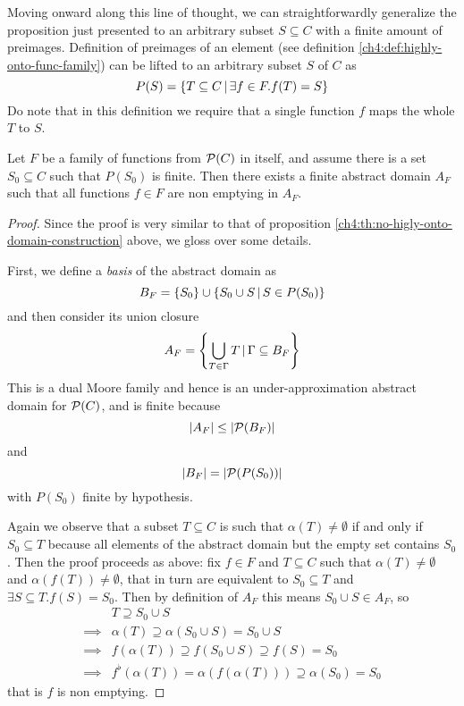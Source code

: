 Moving onward along this line of thought, we can straightforwardly generalize the proposition just presented to an arbitrary subset $S \subseteq C$ with a finite amount of preimages.
Definition of preimages of an element (see definition \ref{ch4:def:highly-onto-func-family}) can be lifted to an arbitrary subset $S$ of $C$ as
\[
P(S) = \{ T \subseteq C \,\vert\, \exists f \in F. f(T) = S \}
\]
Do note that in this definition we require that a single function $f$ maps the whole $T$ to $S$.
\begin{prop}\label{ch4:th:existence-finte-backward}
	Let $F$ be a family of functions from $\mathcal{P}(C)$ in itself, and assume there is a set $S_0 \subseteq C$ such that $P(S_0)$ is finite. Then there exists a finite abstract domain $A_F$ such that all functions $f \in F$ are non emptying in $A_F$.
\end{prop}
\begin{proof}
	Since the proof is very similar to that of proposition \ref{ch4:th:no-higly-onto-domain-construction} above, we gloss over some details.

	First, we define a \textit{basis} of the abstract domain as
	\[
	B_F = \{ S_0 \} \cup \{ S_0 \cup S \,\vert\, S \in P(S_0) \}
	\]
	and then consider its union closure
	\[
	A_F = \left\lbrace \bigcup\limits_{T \in \Gamma} T \,\vert\, \Gamma \subseteq B_F \right\rbrace
	\]
	This is a dual Moore family and hence is an under-approximation abstract domain for $\mathcal{P}(C)$, and is finite because
	\[
	\lvert A_F\rvert \le \lvert\mathcal{P}(B_F)\rvert
	\]
	and
	\[
	\lvert B_F\rvert = \lvert\mathcal{P}(P(S_0))\rvert
	\]
	with $P(S_0)$ finite by hypothesis.

	Again we observe that a subset $T \subseteq C$ is such that $\alpha(T) \neq \emptyset$ if and only if $S_0 \subseteq T$ because all elements of the abstract domain but the empty set contains $S_0$. Then the proof proceeds as above: fix $f \in F$ and $T \subseteq C$ such that $\alpha(T) \neq \emptyset$ and $\alpha(f(T)) \neq \emptyset$, that in turn are equivalent to $S_0 \subseteq T$ and $\exists S \subseteq T. f(S) = S_0$. Then by definition of $A_F$ this means $S_0 \cup S \in A_F$, so
	\begin{align*}
		&T \supseteq S_0 \cup S \\
		\implies& \alpha(T) \supseteq \alpha(S_0 \cup S) = S_0 \cup S \\
		\implies& f(\alpha(T)) \supseteq f(S_0 \cup S) \supseteq f(S) = S_0 \\
		\implies& f^{\flat}(\alpha(T)) = \alpha(f(\alpha(T))) \supseteq \alpha(S_0) = S_0
	\end{align*}
	that is $f$ is non emptying.
\end{proof}

